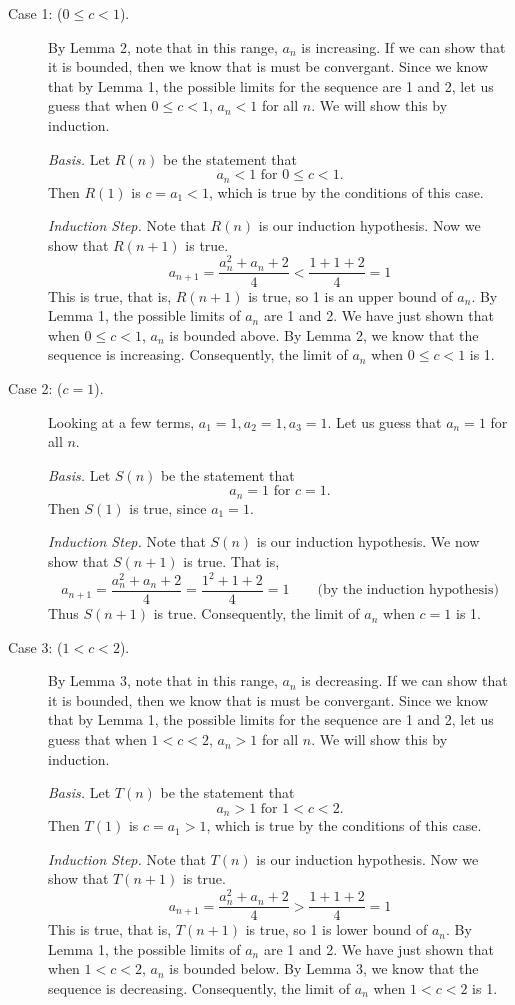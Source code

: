 \documentclass[12pt,letterpaper]{article}
\begin{document}
\begin{description}
\item[Case 1: ($0 \leq c < 1$).] By Lemma 2, note that in this range, $a_n$ is increasing. If we can show that it is bounded, then we know that is must be convergant. Since we know that by Lemma 1, the possible limits for the sequence are 1 and 2, let us guess that when $0 \leq c < 1$, $a_n<1$ for all $n$. We will show this by induction.

\emph{Basis.} Let $R(n)$ be the statement that
\[
a_n<1 \mbox{ for } 0 \leq c < 1.
\]
Then $R(1)$ is $c = a_1 < 1$, which is true by the conditions of this case. 

\emph{Induction Step.} Note that $R(n)$ is our induction hypothesis. Now we show that $R(n+1)$ is true.
\[
a_{n+1} = \frac{a_n^2+a_n+2}{4} < \frac{1 + 1 + 2}{4} = 1
\]
This is true, that is, $R(n+1)$ is true, so 1 is an upper bound of $a_n$. By Lemma 1, the possible limits of $a_n$ are 1 and 2. We have just shown that when $0 \leq c < 1$, $a_n$ is bounded above. By Lemma 2, we know that the sequence is increasing. Consequently, the limit of $a_n$ when $0 \leq c < 1$ is 1.

\item[Case 2: ($c=1$).] Looking at a few terms, $a_1=1,a_2=1,a_3=1$. Let us guess that $a_n=1$ for all $n$.

\emph{Basis.} Let $S(n)$ be the statement that
\[
a_n=1 \mbox{ for } c=1.
\]
Then $S(1)$ is true, since $a_1=1$.

\emph{Induction Step.} Note that $S(n)$ is our induction hypothesis. We now show that $S(n+1)$ is true. That is,
\[
a_{n+1} = \frac{a_n^2+a_n+2}{4} = \frac{1^2+1+2}{4} = 1 \qquad \mbox{(by the induction hypothesis)}
\]
Thus $S(n+1)$ is true. Consequently, the limit of $a_n$ when $c=1$ is 1.

\item[Case 3: ($1<c<2$).] By Lemma 3, note that in this range, $a_n$ is decreasing. If we can show that it is bounded, then we know that is must be convergant. Since we know that by Lemma 1, the possible limits for the sequence are 1 and 2, let us guess that when $1<c<2$, $a_n>1$ for all $n$. We will show this by induction.

\emph{Basis.} Let $T(n)$ be the statement that
\[
a_n>1 \mbox{ for } 1<c<2.
\]
Then $T(1)$ is $c = a_1 > 1$, which is true by the conditions of this case. 

\emph{Induction Step.} Note that $T(n)$ is our induction hypothesis. Now we show that $T(n+1)$ is true.
\[
a_{n+1} = \frac{a_n^2+a_n+2}{4} > \frac{1 + 1 + 2}{4} = 1
\]
This is true, that is, $T(n+1)$ is true, so 1 is lower bound of $a_n$. By Lemma 1, the possible limits of $a_n$ are 1 and 2. We have just shown that when $1<c<2$, $a_n$ is bounded below. By Lemma 3, we know that the sequence is decreasing. Consequently, the limit of $a_n$ when $1<c<2$ is 1.


\end{description}
\end{document}
